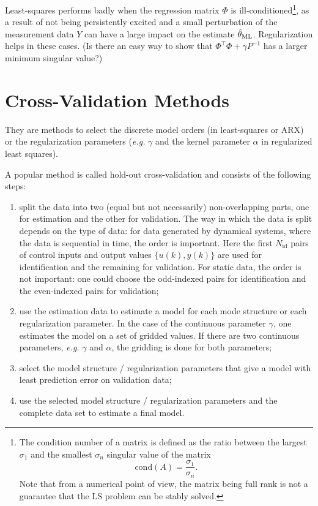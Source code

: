 Least-squares performs badly when the regression matrix $\Phi$ is ill-conditioned\footnote{The condition number of a matrix is defined as the ratio between the largest $\sigma_1$ and the smallest $\sigma_n$ singular value of the matrix
  \begin{equation*}
    \textrm{cond}(A) = \frac{\sigma_1}{\sigma_n}.
  \end{equation*}
  Note that from a numerical point of view, the matrix being full rank is not a guarantee that the LS problem can be stably solved.}, as a result of not being persistently excited and a small perturbation of the measurement data $Y$ can have a large impact on the estimate $\hat{\theta}_\textrm{ML}$. Regularization helps in these cases. (Is there an easy way to show that $\Phi^\top\Phi + \gamma P^{-1}$ has a larger minimum singular value?)

\section{Cross-Validation Methods}
\label{sec:cross-validation}

They are methods to select the discrete model orders (in least-squares or ARX) or the regularization parameters (\textit{e.g.} $\gamma$ and the kernel parameter $\alpha$ in regularized least squares).

A popular method is called hold-out cross-validation and consists of the following steps:
\begin{enumerate}
\item split the data into two (equal but not necessarily) non-overlapping parts, one for estimation and the other for validation. The way in which the data is split depends on the type of data: for data generated by dynamical systems, where the data is sequential in time, the order is important. Here the first $N_\textrm{id}$ pairs of control inputs and output values $\{u(k),y(k)\}$ are used for identification and the remaining for validation. For static data, the order is not important: one could choose the odd-indexed pairs for identification and the even-indexed pairs for validation;
\item use the estimation data to estimate a model for each mode structure or each regularization parameter. In the case of the continuous parameter $\gamma$, one estimates the model on a set of gridded values. If there are two continuous parameters, \textit{e.g.} $\gamma$ and $\alpha$, the gridding is done for both parameters;
\item select the model structure / regularization parameters that give a model with least prediction error on validation data;
\item use the selected model structure / regularization parameters and the complete data set to estimate a final model.
\end{enumerate}


